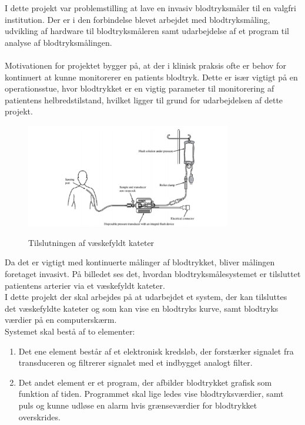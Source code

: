 I dette projekt var problemstilling at lave en invasiv blodtryksmåler til en valgfri institution. Der er i den forbindelse blevet arbejdet med blodtryksmåling, udvikling af hardware til blodtryksmåleren samt udarbejdelse af et program til analyse af blodtryksmålingen.\\ 
\\
Motivationen for projektet bygger på, at der i klinisk praksis ofte er behov for kontinuert at kunne monitorerer en patients blodtryk. Dette er især vigtigt på en operationsstue, hvor blodtrykket er en vigtig parameter til monitorering af patientens helbredstilstand, hvilket ligger til grund for udarbejdelsen af dette projekt.\\
\begin{figure}[H]
	\centering
	\includegraphics[width=0.8\textwidth]{Figurer/Indledning/Opstilling}
	\label{Opstilling}
	\caption{Tilslutningen af væskefyldt kateter}
\end{figure}
Da det er vigtigt med kontinuerte målinger af blodtrykket, bliver målingen foretaget invasivt. På billedet ses det, hvordan blodtryksmålesystemet er tilsluttet patientens arterier via et væskefyldt kateter.\\ 
I dette projekt der skal arbejdes på at udarbejdet et system, der kan tilsluttes det væskefyldte kateter og som kan vise en blodtryks kurve, samt blodtryks værdier på en computerskærm. \\
Systemet skal bestå af to elementer:
\begin{enumerate}
	\item Det ene element består af et elektronisk kredsløb, der forstærker signalet fra transduceren og filtrerer signalet med et indbygget analogt filter.
	\item Det andet element er et program, der afbilder blodtrykket grafisk som funktion af tiden. Programmet skal lige ledes vise blodtryksværdier, samt puls og kunne udløse en alarm hvis grænseværdier for blodtrykket overskrides. 
\end{enumerate}

